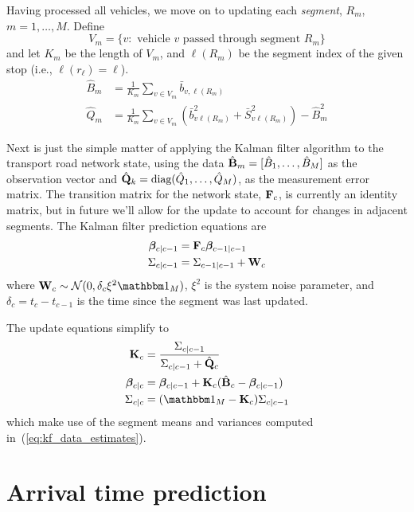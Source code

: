 \documentclass[draftcls,a4paper,onecolumn]{IEEEtran}\usepackage[]{graphicx}\usepackage[]{color}
\begin{document}
Having processed all vehicles, we move on to updating each \emph{segment},
$R_m$, $m = 1, \ldots, M$.
Define
\begin{equation*}
  V_m = \{v:\text{ vehicle $v$ passed through segment } R_m\}
\end{equation*}
and let $K_m$ be the length of $V_m$,
and $\ell(R_m)$ be the segment index of the given stop
(i.e., $\ell(r_\ell) = \ell$).
\begin{align}
  \label{eq:kf_data_estimates}
  \hat B_m &= \frac{1}{K_m} \sum_{v \in V_m} \bar b_{v,\ell(R_m)}  \\
  \hat Q_m &= \frac{1}{K_m} \sum_{v \in V_m} 
  \left(\bar b_{v\ell(R_m)}^2 + \bar S_{v\ell(R_m)}^2\right) - \hat B_m^2
\end{align}

Next is just the simple matter of applying the Kalman filter algorithm 
\cite{Anderson_2012} 
to the transport road network state,
using the data \mbox{$\hat {\mathbf{B}}_m = [\hat B_1, \ldots, \hat B_M]$} 
as the observation vector
and \mbox{$\hat {\mathbf{Q}}_k = \textrm{diag}(\hat Q_1, \ldots, \hat Q_M)$},
as the measurement error matrix.
The transition matrix for the network state, $\mathbf{F}_c$,
is currently an identity matrix,
but in future we'll allow for the update to account for
changes in adjacent segments.
The Kalman filter prediction equations are
\begin{align}
  \boldsymbol{\beta}_{c|c-1} &= \mathbf{F}_c\boldsymbol{\beta}_{c-1|c-1} \\
  \Sigma_{c|c-1} &= \Sigma_{c-1|c-1} + \mathbf{W}_c
\end{align}
where $\bW_c \sim \mathcal{N}(0, \delta_c\xi^2\eye_M)$, 
$\xi^2$ is the system noise parameter,
and $\delta_c = t_c - t_{c-1}$ is the time since the segment
was last updated.

The update equations simplify to
\begin{align}
  \bK_c &= \frac{\Sigma_{c|c-1}}{\Sigma_{c|c-1} + \hat {\mat Q}_c} \\
  \bbeta_{c|c} &= \bbeta_{c|c-1} + \bK_c(\hat {\mat B}_c - \bbeta_{c|c-1}) \\
  \Sigma_{c|c} &= (\eye_M - \bK_c) \Sigma_{c|c-1}
\end{align}
which make use of the segment means and variances computed in~(\ref{eq:kf_data_estimates}).


\section{Arrival time prediction}
\label{sec:arrival_time}
\end{document}
